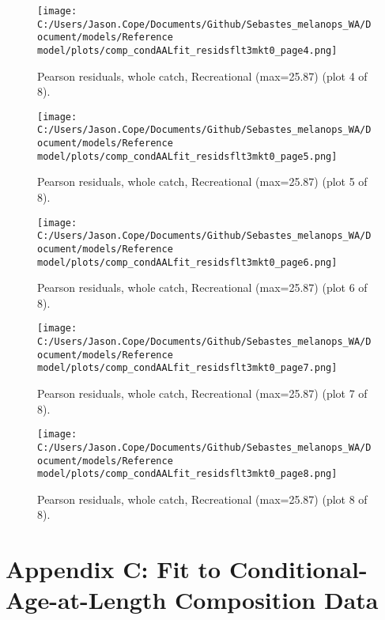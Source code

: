\documentclass[11pt,
  english,
  letterpaper,
]{article}
\begin{document}
\begin{figure}
\centering
\texttt{[image: C:/Users/Jason.Cope/Documents/Github/Sebastes\_melanops\_WA/Document/models/Reference model/plots/comp\_condAALfit\_residsflt3mkt0\_page4.png]}
\caption{Pearson residuals, whole catch, Recreational (max=25.87) (plot 4 of 8).\label{fig:comp_condAALfit_residsflt3mkt0_page4}}
\end{figure}

\begin{figure}
\centering
\texttt{[image: C:/Users/Jason.Cope/Documents/Github/Sebastes\_melanops\_WA/Document/models/Reference model/plots/comp\_condAALfit\_residsflt3mkt0\_page5.png]}
\caption{Pearson residuals, whole catch, Recreational (max=25.87) (plot 5 of 8).\label{fig:comp_condAALfit_residsflt3mkt0_page5}}
\end{figure}

\begin{figure}
\centering
\texttt{[image: C:/Users/Jason.Cope/Documents/Github/Sebastes\_melanops\_WA/Document/models/Reference model/plots/comp\_condAALfit\_residsflt3mkt0\_page6.png]}
\caption{Pearson residuals, whole catch, Recreational (max=25.87) (plot 6 of 8).\label{fig:comp_condAALfit_residsflt3mkt0_page6}}
\end{figure}

\begin{figure}
\centering
\texttt{[image: C:/Users/Jason.Cope/Documents/Github/Sebastes\_melanops\_WA/Document/models/Reference model/plots/comp\_condAALfit\_residsflt3mkt0\_page7.png]}
\caption{Pearson residuals, whole catch, Recreational (max=25.87) (plot 7 of 8).\label{fig:comp_condAALfit_residsflt3mkt0_page7}}
\end{figure}

\begin{figure}
\centering
\texttt{[image: C:/Users/Jason.Cope/Documents/Github/Sebastes\_melanops\_WA/Document/models/Reference model/plots/comp\_condAALfit\_residsflt3mkt0\_page8.png]}
\caption{Pearson residuals, whole catch, Recreational (max=25.87) (plot 8 of 8).\label{fig:comp_condAALfit_residsflt3mkt0_page8}}
\end{figure}

\clearpage

\hypertarget{app-c}{%
\section{Appendix C: Fit to Conditional-Age-at-Length Composition Data}\label{app-c}}
\end{document}
